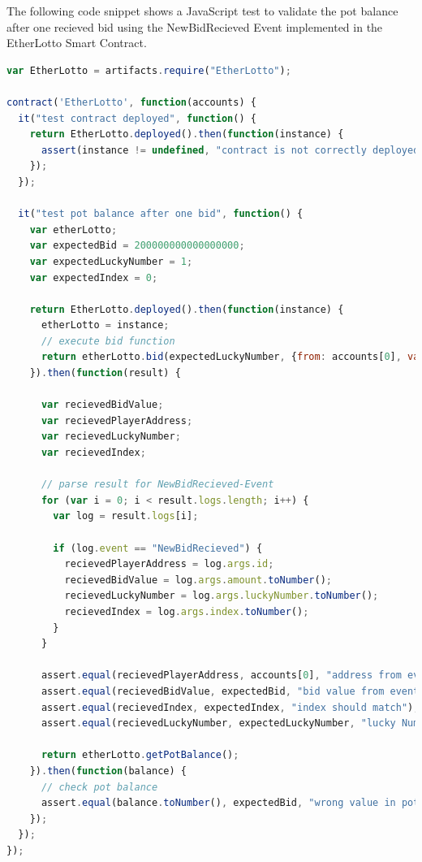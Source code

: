 The following code snippet shows a JavaScript test to validate the pot balance after one recieved bid using the NewBidRecieved Event implemented in the EtherLotto Smart Contract.
\begin{lstlisting}[language=JavaScript]
var EtherLotto = artifacts.require("EtherLotto");

contract('EtherLotto', function(accounts) {
  it("test contract deployed", function() {
    return EtherLotto.deployed().then(function(instance) {
      assert(instance != undefined, "contract is not correctly deployed");
    });
  });

  it("test pot balance after one bid", function() {
    var etherLotto;
    var expectedBid = 200000000000000000;
    var expectedLuckyNumber = 1;
    var expectedIndex = 0;

    return EtherLotto.deployed().then(function(instance) {
      etherLotto = instance;
      // execute bid function
      return etherLotto.bid(expectedLuckyNumber, {from: accounts[0], value: expectedBid});
    }).then(function(result) {

      var recievedBidValue;
      var recievedPlayerAddress;
      var recievedLuckyNumber;
      var recievedIndex;

      // parse result for NewBidRecieved-Event
      for (var i = 0; i < result.logs.length; i++) {
        var log = result.logs[i];

        if (log.event == "NewBidRecieved") {
          recievedPlayerAddress = log.args.id;
          recievedBidValue = log.args.amount.toNumber();
          recievedLuckyNumber = log.args.luckyNumber.toNumber();
          recievedIndex = log.args.index.toNumber();
        }
      }

      assert.equal(recievedPlayerAddress, accounts[0], "address from event and sender address need to match");
      assert.equal(recievedBidValue, expectedBid, "bid value from event and sent bid have to match");
      assert.equal(recievedIndex, expectedIndex, "index should match");
      assert.equal(recievedLuckyNumber, expectedLuckyNumber, "lucky Number should match");

      return etherLotto.getPotBalance();
    }).then(function(balance) {
      // check pot balance
      assert.equal(balance.toNumber(), expectedBid, "wrong value in potBalance, bid went wrong");
    });
  });
});
\end{lstlisting}

\newpage
